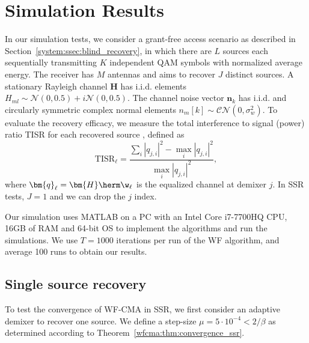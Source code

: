 \section{Simulation Results} \label{wfcma:Simulations}
In our simulation tests, we consider a grant-free access scenario as described in Section~\ref{system:ssec:blind_recovery}, in which there are $L$ sources each sequentially transmitting $K$ independent QAM symbols with normalized average energy. 
The receiver has $M$ antennas and aims to recover $J$ distinct sources.
A stationary Rayleigh channel $\bm{H}$ has i.i.d. elements $H_{ml}\sim\mathcal{N}(0,0.5)+i\mathcal{N}(0,0.5)$.
The channel noise vector $\bm{n}_k$ has i.i.d. and circularly symmetric complex normal elements  $n_m[k]\sim \mathcal{CN}(0,\sigma_w^2)$.
To evaluate the recovery efficacy, we measure the total interference to signal (power) ratio TISR for each recovered source \cite{Ding2000}, defined as
\begin{equation}
\mathrm{TISR}_{\ell}=\frac{\sum_i |q_{j,i}|^2- \max_i |q_{j,i}|^2}{\max_i |q_{j,i}|^2}, \label{wfcma:eqn:totalinterferenceMSR}
\end{equation}
where  $\bm{q}_{\ell} = \bm{H}\herm\w_{\ell}$ is the equalized channel at demixer $j$. 
In SSR tests, $J=1$ and we can drop the $j$ index.

Our simulation uses MATLAB on a PC with an Intel Core i7-7700HQ CPU, 16GB of RAM and 64-bit OS to implement the algorithms and run the simulations.
We use $T=1000$ iterations per run of the WF algorithm, and average 100 runs to obtain our results.


\subsection{Single source recovery} \label{wfcma:sim:singlesource}
To test the convergence of WF-CMA in SSR, we first consider an adaptive demixer to recover one source.  We define a step-size $\mu=5\cdot10^{-4}<2/\beta$ as determined according to Theorem~\ref{wfcma:thm:convergence_ssr}.

